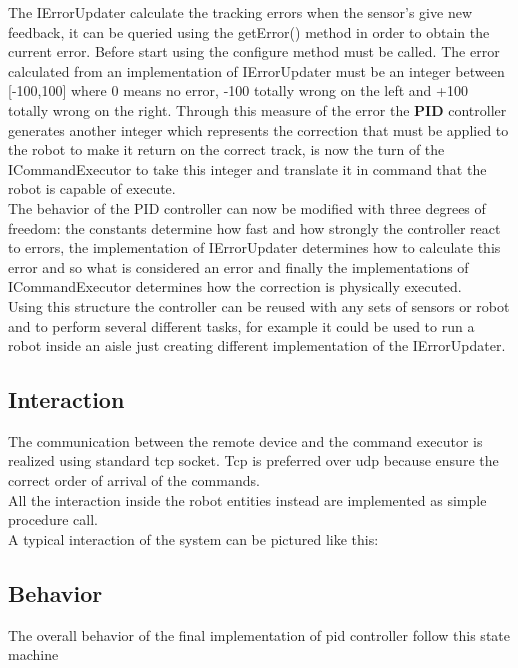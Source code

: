 \documentclass{llncs}
\begin{document}
\noindent The IErrorUpdater calculate the tracking errors when the sensor's give new feedback, it can be queried using the getError() method in order to obtain the current error. Before start using the configure method must be called. The error calculated from an implementation of IErrorUpdater must be an integer between [-100,100] where 0 means no error, -100 totally wrong on the left and +100 totally wrong on the right. Through this measure of the error the \textbf{PID} controller generates another integer which represents the correction that must be applied to the robot to make it return on the correct track, is now the turn of the ICommandExecutor to take this integer and translate it in command that the robot is capable of execute.\\ 
The behavior of the PID controller can now be modified with three degrees of freedom: the constants determine how fast and how strongly the controller react to errors, the implementation of IErrorUpdater determines how to calculate this error and so what is considered an error and finally the implementations of ICommandExecutor determines how the correction is physically executed.\\
Using this structure the controller can be reused with any sets of sensors or robot and to perform several different tasks, for example it could be used to run a robot inside an aisle just creating different implementation of the IErrorUpdater.\\

\subsection{Interaction}
The communication between the remote device and the command executor is realized using standard tcp socket. Tcp is preferred over udp because ensure the correct order of arrival of the commands.\\
All the interaction inside the robot entities instead are implemented as simple procedure call. \\
A typical interaction of the system can be pictured like this:
\begin{center}
\end{center}

\subsection{Behavior}
The overall behavior of the final implementation of pid controller follow this state machine 
\begin{center}
\end{center}
\end{document}
